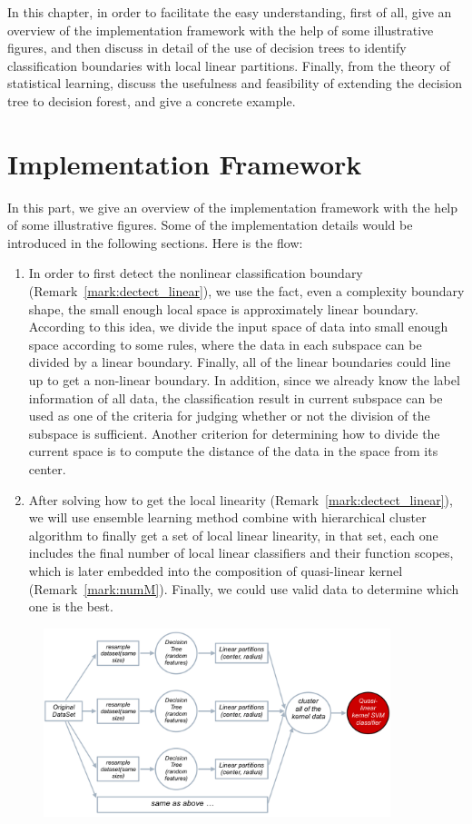 \documentclass[master]{IPSstyle}
\begin{document}
{In this chapter, in order to facilitate the easy understanding, first of all, give an overview of the implementation framework with the help of some illustrative figures, and then discuss in detail of the use of decision trees to identify classification boundaries with local linear partitions. Finally, from the theory of statistical learning, discuss the usefulness and feasibility of extending the decision tree to decision forest, and give a concrete example.

\section{Implementation Framework}
In this part, we give an overview of the implementation framework with the help of some illustrative figures. Some of the implementation details would be introduced in the following sections. Here is the flow:
\begin{enumerate}
\item In order to first detect the nonlinear classification boundary (Remark~\ref{mark:dectect_linear}), we use the fact, even a complexity boundary shape, the small enough local space is approximately linear boundary. According to this idea, we divide the input space of data into small enough space according to some rules, where the data in each subspace can be divided by a linear boundary. Finally, all of the linear boundaries could line up to get a non-linear boundary. In addition, since we already know the label information of all data, the classification result in current subspace can be used as one of the criteria for judging whether or not the division of the subspace is sufficient. Another criterion for determining how to divide the current space is to compute the distance of the data in the space from its center.
\item After solving how to get the local linearity (Remark~\ref{mark:dectect_linear}), we will use ensemble learning method combine with hierarchical cluster algorithm to finally get a set of local linear linearity, in that set, each one includes the final number of local linear classifiers and their function scopes, which is later embedded into the composition of quasi-linear kernel (Remark~\ref{mark:numM}). Finally, we could use valid data to determine which one is the best.
\end{enumerate}
\begin{figure}[H]
    \centering
    \includegraphics[width=0.9\textwidth]{figures/ch3_RF_framework.png}

\end{figure}}
\end{document}
